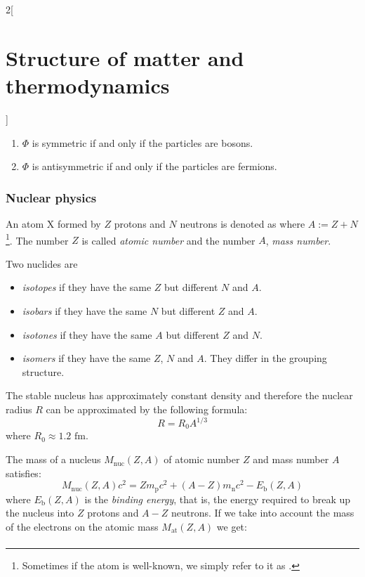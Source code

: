 \documentclass[../../../main.tex]{subfiles}
\begin{document}
\begin{multicols}{2}[\section{Structure of matter and thermodynamics}]
\begin{prop}
    \begin{enumerate}
      \item $\Phi$ is symmetric if and only if the particles are bosons.
      \item $\Phi$ is antisymmetric if and only if the particles are fermions.
    \end{enumerate}
  \end{prop}
  \subsubsection*{Nuclear physics}
  \begin{definition}[Atom]
    An atom X formed by $Z$ protons and $N$ neutrons is denoted as  where $A:=Z+N$\footnote{Sometimes if the atom  is well-known, we simply refer to it as .}. The number $Z$ is called \textit{atomic number} and the number $A$, \textit{mass number}.
  \end{definition}
  \begin{definition}
    Two nuclides are
    \begin{itemize}
      \item \textit{isotopes} if they have the same $Z$ but different $N$ and $A$.
      \item \textit{isobars} if they have the same $N$ but different $Z$ and $A$.
      \item \textit{isotones} if they have the same $A$ but different $Z$ and $N$.
      \item \textit{isomers} if they have the same $Z$, $N$ and $A$. They differ in the grouping structure.
    \end{itemize}
  \end{definition}
  \begin{prop}
    The stable nucleus has approximately constant density and therefore the nuclear radius $R$ can be approximated by the following formula:
    $$R=R_0A^{1/3}$$ where $R_0\approx1.2\text{ fm}$.
  \end{prop}
  \begin{prop}
    The mass of a nucleus $M_\text{nuc}(Z,A)$ of atomic number $Z$ and mass number $A$ satisfies:
    $$M_\text{nuc}(Z,A)c^2=Zm_\text{p}c^2+(A-Z)m_\text{n}c^2-E_\text{b}(Z,A)$$ where $E_\text{b}(Z,A)$ is the \textit{binding energy}, that is, the energy required to break up the nucleus into $Z$ protons and $A-Z$ neutrons. If we take into account the mass of the electrons on the atomic mass $M_\text{at}(Z,A)$ we get:
    \begin{multline*}

\end{multline*}
\end{prop}
\end{multicols}
\end{document}

